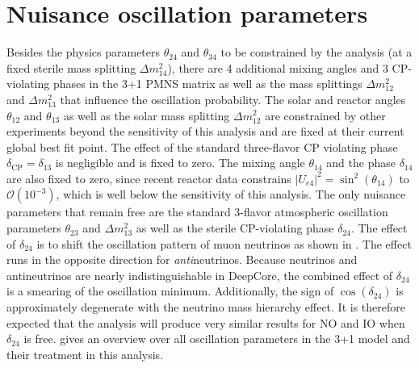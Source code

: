 \section{Nuisance oscillation parameters}
Besides the physics parameters $\theta_{24}$ and $\theta_{34}$ to be constrained by the analysis (at a fixed sterile mass splitting $\Delta m^2_{14}$), there are 4 additional mixing angles and 3 CP-violating phases in the 3+1 PMNS matrix as well as the mass splittings $\Delta m^2_{12}$ and $\Delta m^2_{13}$ that influence the oscillation probability. The solar and reactor angles $\theta_{12}$ and $\theta_{13}$ as well as the solar mass splitting $\Delta m^2_{12}$ are constrained by other experiments beyond the sensitivity of this analysis and are fixed at their current global best fit point. The effect of the standard three-flavor CP violating phase $\delta_{\mathrm{CP}}=\delta_{13}$ is negligible and is fixed to zero.
The mixing angle $\theta_{14}$ and the phase $\delta_{14}$ are also fixed to zero, since recent reactor data constrains $|U_{e4}|^2 = \sin^2(\theta_{14})$ to $\mathcal{O}(10^{-3})$, which is well below the sensitivity of this analysis.
The only nuisance parameters that remain free are the standard 3-flavor atmospheric oscillation parameters $\theta_{23}$ and $\Delta m^2_{13}$ as well as the sterile CP-violating phase $\delta_{24}$.
The effect of $\delta_{24}$ is to shift the oscillation pattern of muon neutrinos as shown in .
The effect runs in the opposite direction for \emph{anti}neutrinos.
Because neutrinos and antineutrinos are nearly indistinguishable in DeepCore, the combined effect of $\delta_{24}$ is a smearing of the oscillation minimum.
Additionally, the sign of $\cos(\delta_{24})$ is approximately degenerate with the neutrino mass hierarchy effect.
It is therefore expected that the analysis will produce very similar results for NO and IO when $\delta_{24}$ is free.
 gives an overview over all oscillation parameters in the 3+1 model and their treatment in this analysis.

